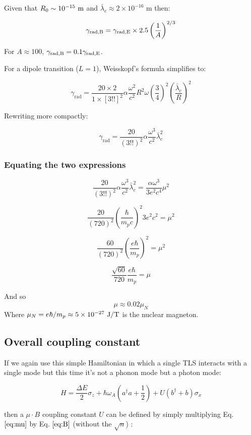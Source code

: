 \documentclass[
]{article}
\renewcommand{\[}{\begin{equation}}
\renewcommand{\]}{\end{equation}}
\begin{document}
Given that \(R_0 \sim 10^{-15} \ \rm m\) and
\(\bar\lambda_c \approx 2 \times 10^{-16} \text{ m}\) then:

\[
\gamma_{\rm rad, B} = \gamma_{\rm rad, E} \times 2.5\left( \frac{1}{A} \right)^{2/3}
\]

For \(A\approx100\), \(\gamma_{\rm rad, B} = 0.1\gamma_{\rm rad, E}\).

For a dipole transition (\(L=1\)), Weisskopf's formula simplifies to:

\[
\gamma_{\text{rad}} = \frac{20 \times 2}{1 \times [3!!]^2} \alpha \frac{\omega^2}{c^2} R^2 \omega \left(\frac{3}{4} \right)^2 \left( \frac{\bar\lambda_c}{R} \right)^2
\]

Rewriting more compactly:

\[
\gamma_{\text{rad}} = \frac{20}{(3!!)^2} \alpha \frac{\omega^3}{c^2} \bar\lambda_c^2
\]

\subsubsection{Equating the two
expressions}\label{equating-the-two-expressions-1}

\[
\frac{20}{(3!!)^2} \alpha \frac{\omega^3}{c^2} \bar\lambda_c^2 = \frac{\alpha \omega^3}{3 e^2 c^4} \mu^2
\]

\[
\frac{20}{(720)^2} \left( \frac{\hbar}{m_p c} \right)^2 3e^2c^2 = \mu^2
\]

\[
\frac{60}{(720)^2} \left( \frac{e\hbar}{m_p} \right)^2= \mu^2
\]

\[
\frac{\sqrt{60}}{720} \frac{e\hbar}{m_p} = \mu
\]

And so \[
\mu \approx 0.02 \mu_N
\label{eq:mu}
\] Where \(\mu_N = e\hbar/m_p \approx 5\times 10^{-27} \ \rm J/T\) is
the nuclear magneton.

\subsection{Overall coupling
constant}\label{overall-coupling-constant-2}

If we again use this simple Hamiltonian in which a single TLS interacts
with a single mode but this time it's not a phonon mode but a photon
mode:

\[
H = \frac{\Delta E}{2} \sigma_z + \hbar\omega_A\left(a^{\dagger}a +\frac{1}{2}\right) + U\left( b^{\dagger} + b \right)\sigma_x
\]

then a \(\mu \cdot B\) coupling constant \(U\) can be defined by simply
multiplying Eq. \(\ref{eq:mu}\) by Eq. \(\ref{eq:B}\) (without the
\(\sqrt{n}\)) :
\end{document}
